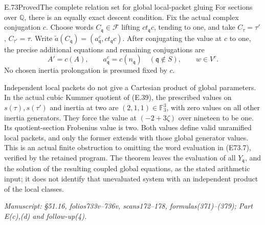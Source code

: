 \begin{statement}{E.73}{Proved}{The complete relation set for global local-packet gluing}
For sections over $\mathbb Q$, there is an equally exact
descent condition. Fix the actual complex conjugation $c$.
Choose words $C_{\mathfrak q}\in\mathcal F$ lifting
$ct_{\mathfrak q}c$, tending to one, and take
$C_\tau=\tau'$, $C_{\tau'}=\tau$. Write
$\widetilde a(C_{\mathfrak q})
=(a_{\mathfrak q}^{c},ct_{\mathfrak q}c)$.
After conjugating the value at $c$ to one, the precise
additional equations and remaining conjugations are
\[
 A'=c(A),\qquad a_{\mathfrak q}^{c}=c(n_{\mathfrak q})
       \quad(\mathfrak q\notin S),\qquad w\in V^c.
 \tag{E73.11}
\]
No chosen inertia prolongation is presumed fixed by $c$.

Independent local packets do not give a Cartesian product
of global parameters. In the actual cubic Kummer quotient
of (E.39), the prescribed values on $s(\tau),s(\tau')$
and inertia at two are $(2,1,1)\in\mathbb F_3^3$,
with zero values on all other inertia generators.
They force the value at $(-2+3\zeta)$ over nineteen to
be one. Its quotient-section Frobenius value is two.
Both values define valid unramified local packets,
and only the former extends with those global generator
values. This is an actual finite obstruction to omitting
the word evaluation in (E73.7), verified by the retained
program. The theorem leaves the evaluation of all
$Y_{\mathfrak q}$, and the solution of the resulting
coupled global equations, as the stated arithmetic
input; it does not identify that unevaluated system
with an independent product of the local classes.

\emph{Manuscript: \S51.16, folios733v--736v, scans172--178,
formulas(371)--(379); Part E(c),(d) and follow-up(4).}
\end{statement}

